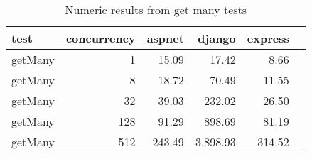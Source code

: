 \FloatBarrier
\begin{table}[!htp]\centering
    \caption{Numeric results from get many tests}\label{tab:resultsGetMany}
    \scriptsize
    \begin{tabular}{lrrrrr}\toprule
        test    & concurrency & aspnet & django    & express \\\midrule
getMany &1 &15.09 &17.42 &8.66 \\
getMany &8 &18.72 &70.49 &11.55 \\
getMany &32 &39.03 &232.02 &26.50 \\
getMany &128 &91.29 &898.69 &81.19 \\
getMany &512 &243.49 &3,898.93 &314.52 \\
        \bottomrule
    \end{tabular}
\end{table}
\FloatBarrier
